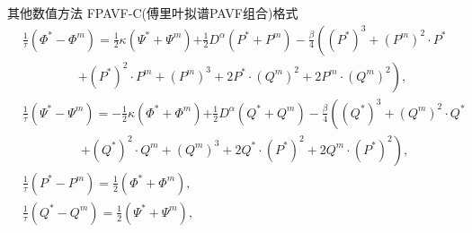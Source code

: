 \documentclass[aspectratio=169]{beamer}
\numberwithin{theorem}{section} %
\numberwithin{equation}{section}%
\numberwithin{figure}{section}%
\numberwithin{table}{section}%
\begin{document}
\begin{frame}{其他数值方法}
	\noindent FPAVF-C(傅里叶拟谱PAVF组合)格式
	{\small\begin{align}
	&\frac{1}{\tau}\left(\varPhi^{*}-\varPhi^{m}\right)=\frac{1}{2}\kappa(\Psi^{*}+\Psi^{m}){+\frac{1}{2}D^{\alpha} (P^{*}+P^{m})}-\frac{\beta}{4}\left( (P^{*})^3+ (P^{m})^{2}\cdot P^{*}\right.\nonumber\\
			&~~~~~~~~~~~~~~~~~~~~\left.+ (P^{*})^{2}\cdot P^{m}+ (P^{m})^{3}+2 P^{*}\cdot (Q^{m})^{2}+2 P^{m}\cdot (Q^{m})^{2}\right),\label{eq_PAVF:90}\\
	&\frac{1}{\tau}\left(\Psi^{*}-\Psi^{m}\right)=-\frac{1}{2}\kappa (\varPhi^{*}+\varPhi^{m}){+\frac{1}{2}D^{\alpha} (Q^{*}+Q^{m})}-\frac{\beta}{4}\left( (Q^{*})^3+ (Q^{m})^{2}\cdot Q^{*}\right.\nonumber\\
			&~~~~~~~~~~~~~~~~~~~~~\left.+ (Q^{*})^{2}\cdot Q^{m}+ (Q^{m})^{3}+2 Q^{*}\cdot (P^{*})^{2}+2 Q^{m}\cdot (P^{*})^{2}\right),\label{eq_PAVF:91}\\
	&\frac{1}{\tau}\left(P^{*}-P^{m}\right)=\frac{1}{2}(\varPhi^{*}+\varPhi^{m}),\label{eq_PAVF:92}\\
	&\frac{1}{\tau}\left(Q^{*}-Q^{m}\right)=\frac{1}{2}(\Psi^{*}+\Psi^{m}),\label{eq_PAVF:93}\\
	\end{align}}
\end{frame}
\end{document}
